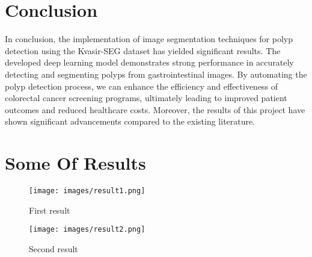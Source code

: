 \documentclass[12pt]{article}
\begin{document}
\section{Conclusion}
In conclusion, the implementation of image segmentation techniques for polyp detection using the Kvasir-SEG dataset has yielded significant results. The developed deep learning model demonstrates strong performance in accurately detecting and segmenting polyps from gastrointestinal images. By automating the polyp detection process, we can enhance the efficiency and effectiveness of colorectal cancer screening programs, ultimately leading to improved patient outcomes and reduced healthcare costs. Moreover, the results of this project have shown significant advancements compared to the existing literature.

\section{Some Of Results}

\begin{figure}[!h]
    \centering
    \texttt{[image: images/result1.png]}
    \caption{First result}
\end{figure}

\begin{figure}[!h]
    \centering
    \texttt{[image: images/result2.png]}
    \caption{Second result}
\end{figure}


\end{document}

